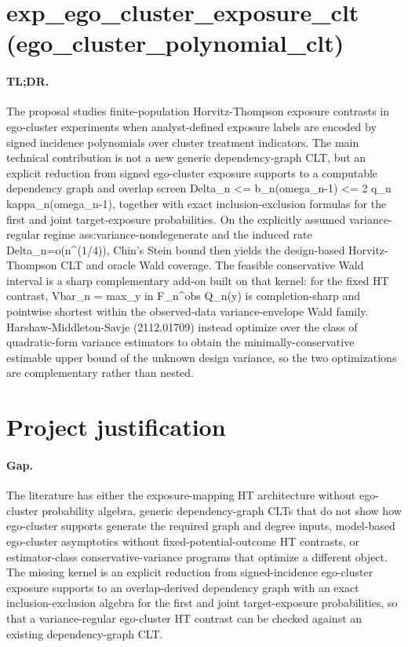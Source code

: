 \documentclass{article}
\begin{document}
\section*{exp_ego_cluster_exposure_clt (ego_cluster_polynomial_clt)}

\paragraph{TL;DR.} The proposal studies finite-population Horvitz-Thompson exposure contrasts in ego-cluster experiments when analyst-defined exposure labels are encoded by signed incidence polynomials over cluster treatment indicators. The main technical contribution is not a new generic dependency-graph CLT, but an explicit reduction from signed ego-cluster exposure supports to a computable dependency graph and overlap screen Delta_n <= b_n(omega_n-1) <= 2 q_n kappa_n(omega_n-1), together with exact inclusion-exclusion formulas for the first and joint target-exposure probabilities. On the explicitly assumed variance-regular regime ass:variance-nondegenerate and the induced rate Delta_n=o(n^(1/4)), Chin's Stein bound then yields the design-based Horvitz-Thompson CLT and oracle Wald coverage. The feasible conservative Wald interval is a sharp complementary add-on built on that kernel: for the fixed HT contrast, Vbar_n = max_{y in F_n^obs} Q_n(y) is completion-sharp and pointwise shortest within the observed-data variance-envelope Wald family. Harshaw-Middleton-Savje (2112.01709) instead optimize over the class of quadratic-form variance estimators to obtain the minimally-conservative estimable upper bound of the unknown design variance, so the two optimizations are complementary rather than nested.

\section{Project justification}

\paragraph{Gap.} The literature has either the exposure-mapping HT architecture without ego-cluster probability algebra, generic dependency-graph CLTs that do not show how ego-cluster supports generate the required graph and degree inputs, model-based ego-cluster asymptotics without fixed-potential-outcome HT contrasts, or estimator-class conservative-variance programs that optimize a different object. The missing kernel is an explicit reduction from signed-incidence ego-cluster exposure supports to an overlap-derived dependency graph with an exact inclusion-exclusion algebra for the first and joint target-exposure probabilities, so that a variance-regular ego-cluster HT contrast can be checked against an existing dependency-graph CLT.
\end{document}
